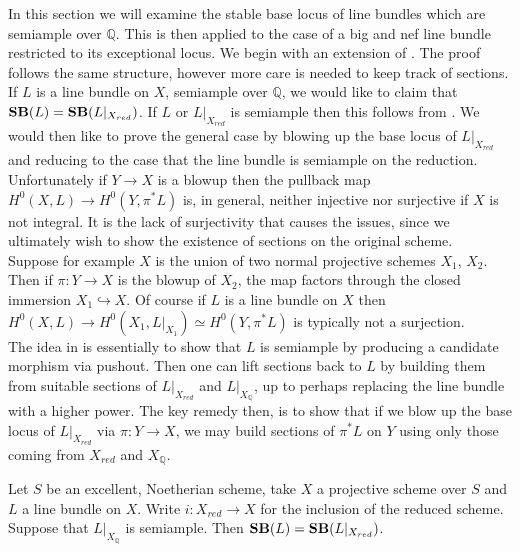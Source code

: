 In this section we will examine the stable base locus of line bundles which are semiample over $\mathbb{Q}$. This is then applied to the case of a big and nef line bundle restricted to its exceptional locus.  We begin with an extension of \cite[Theorem 1.10]{witaszek2020keels}. The proof follows the same structure, however more care is needed to keep track of sections.\\

If $L$ is a line bundle on $X$, semiample over $\mathbb{Q}$, we would like to claim that $\mathbf{SB}(L)=\mathbf{SB}(L|_{X_{red}})$. If $L$ or $L|_{X_{red}}$ is semiample then this follows from \cite[Thereom 1.10]{witaszek2020keels}. We would then like to prove the general case by blowing up the base locus of $L|_{X_{red}}$ and reducing to the case that the line bundle is semiample on the reduction. Unfortunately if $Y \to X$ is a blowup then the pullback map $H^{0}(X,L) \to H^{0}(Y,\pi^{*}L)$ is, in general, neither injective nor surjective if $X$ is not integral. It is the lack of surjectivity that causes the issues, since we ultimately wish to show the existence of sections on the original scheme.\\ 

Suppose for example $X$ is the union of two normal projective schemes $X_{1}$, $X_{2}$. Then if $\pi:Y \to X$ is the blowup of $X_{2}$, the map factors through the closed immersion $X_{1} \hookrightarrow X$. Of course if $L$ is a line bundle on $X$ then $H^{0}(X,L) \to H^{0}(X_{1},L|_{X_{1}})\simeq H^{0}(Y,\pi^{*}L)$ is typically not a surjection.\\

 The idea in \cite[Thereom 1.10]{witaszek2020keels} is essentially to show that $L$ is semiample by producing a candidate morphism via pushout. Then one can lift sections back to $L$ by building them from suitable sections of $L|_{X_{red}}$ and $L|_{X_{\mathbb{Q}}}$, up to perhaps replacing the line bundle with a higher power. The key remedy then, is to show that if we blow up the base locus of $L|_{X_{red}}$ via $\pi:Y \to X$, we may build sections of $\pi^{*}L$ on $Y$ using only those coming from $X_{red}$ and $X_{\mathbb{Q}}$.\\

\begin{theorem}\label{BaseRed}
	Let $S$ be an excellent, Noetherian scheme, take $X$ a projective scheme over $S$ and $L$ a line bundle on $X$. Write $i:X_{red} \to X$ for the inclusion of the reduced scheme. Suppose that $L|_{X_{\mathbb{Q}}}$ is semiample. Then $\mathbf{SB}(L)=\mathbf{SB}(L|_{X_{red}})$.
\end{theorem}

